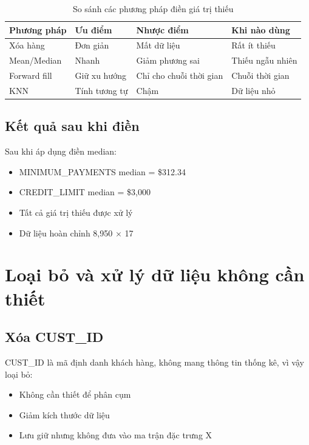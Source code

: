 \begin{table}[H]
\centering
\caption{So sánh các phương pháp điền giá trị thiếu}
\begin{tabular}{|l|p{3cm}|p{2cm}|p{3cm}|}
\hline
\textbf{Phương pháp} & \textbf{Ưu điểm} & \textbf{Nhược điểm} & \textbf{Khi nào dùng} \\
\hline
Xóa hàng & Đơn giản & Mất dữ liệu & Rất ít thiếu \\
\hline
Mean/Median & Nhanh & Giảm phương sai & Thiếu ngẫu nhiên \\
\hline
Forward fill & Giữ xu hướng & Chỉ cho chuỗi thời gian & Chuỗi thời gian \\
\hline
KNN & Tính tương tự & Chậm & Dữ liệu nhỏ \\
\hline
\end{tabular}
\end{table}

\subsection{Kết quả sau khi điền}

Sau khi áp dụng điền median:
\begin{itemize}
    \item MINIMUM\_PAYMENTS median = \$312.34
    \item CREDIT\_LIMIT median = \$3,000
    \item Tất cả giá trị thiếu được xử lý
    \item Dữ liệu hoàn chỉnh 8,950 × 17
\end{itemize}

\section{Loại bỏ và xử lý dữ liệu không cần thiết}

\subsection{Xóa CUST\_ID}

CUST\_ID là mã định danh khách hàng, không mang thông tin thống kê, vì vậy loại bỏ:

\begin{itemize}
    \item Không cần thiết để phân cụm
    \item Giảm kích thước dữ liệu
    \item Lưu giữ nhưng không đưa vào ma trận đặc trưng X
\end{itemize}

